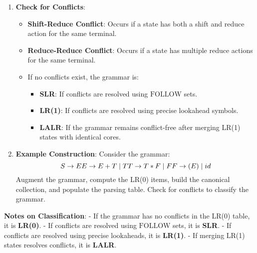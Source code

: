 \begin{enumerate}
  \item \textbf{Check for Conflicts}:
  \begin{itemize}
    \item \textbf{Shift-Reduce Conflict}: Occurs if a state has both a shift and reduce action for the same terminal.
    \item \textbf{Reduce-Reduce Conflict}: Occurs if a state has multiple reduce actions for the same terminal.
    \item If no conflicts exist, the grammar is:
    \begin{itemize}
      \item \textbf{SLR}: If conflicts are resolved using \(\text{FOLLOW}\) sets.
      \item \textbf{LR(1)}: If conflicts are resolved using precise lookahead symbols.
      \item \textbf{LALR}: If the grammar remains conflict-free after merging LR(1) states with identical cores.
    \end{itemize}
  \end{itemize}

  \item \textbf{Example Construction}:
  Consider the grammar:
  \[
  S \to E \\
  E \to E + T \mid T \\
  T \to T * F \mid F \\
  F \to (E) \mid id
  \]
  Augment the grammar, compute the LR(0) items, build the canonical collection, and populate the parsing table. Check for conflicts to classify the grammar.

\end{enumerate}

\textbf{Notes on Classification}:
- If the grammar has no conflicts in the LR(0) table, it is \textbf{LR(0)}.
- If conflicts are resolved using \(\text{FOLLOW}\) sets, it is \textbf{SLR}.
- If conflicts are resolved using precise lookaheads, it is \textbf{LR(1)}.
- If merging LR(1) states resolves conflicts, it is \textbf{LALR}.
